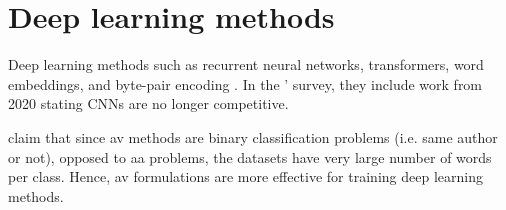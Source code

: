 \section{Deep learning methods}
\label{sec:deep_learning_methods}

Deep learning methods such as recurrent neural networks, transformers, word embeddings, and byte-pair encoding \citep{tyo_state_2022}.
In the \citet{tyo_state_2022}' survey, they include work from 2020 stating CNNs are no longer competitive.

\citet{tyo_state_2022} claim that since \ac{av} methods are binary classification problems (i.e. same author or not), 
opposed to \ac{aa} problems, the datasets have very large number of words per class. 
Hence, \ac{av} formulations are more effective for training deep learning methods.